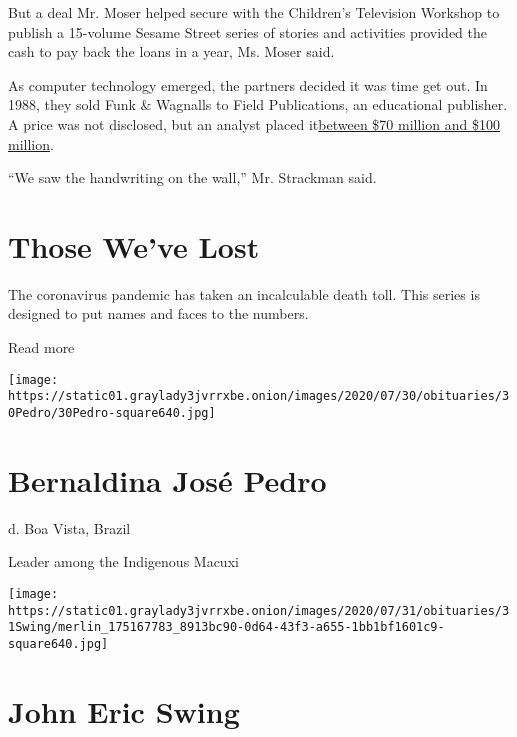But a deal Mr. Moser helped secure with the Children's Television
Workshop to publish a 15-volume Sesame Street series of stories and
activities provided the cash to pay back the loans in a year, Ms. Moser
said.

As computer technology emerged, the partners decided it was time get
out. In 1988, they sold Funk \& Wagnalls to Field Publications, an
educational publisher. A price was not disclosed, but an analyst placed
it\href{https://www.nytimes3xbfgragh.onion/1988/05/27/business/the-media-business-field-publications-agrees-to-buy-funk-wagnalls.html}{between
\$70 million and \$100 million}.

``We saw the handwriting on the wall,'' Mr. Strackman said.

\href{https://www.nytimes3xbfgragh.onion/interactive/2020/obituaries/people-died-coronavirus-obituaries.html?action=click\&pgtype=Article\&state=default\&region=BELOW_MAIN_CONTENT\&context=covid_obits_promo}{}

\hypertarget{those-weve-lost}{%
\section{Those We've Lost}\label{those-weve-lost}}

The coronavirus pandemic has taken an incalculable death toll. This
series is designed to put names and faces to the numbers.

Read more

\texttt{[image: https://static01.graylady3jvrrxbe.onion/images/2020/07/30/obituaries/30Pedro/30Pedro-square640.jpg]}

\hypertarget{bernaldina-josuxe9-pedro}{%
\section{Bernaldina José Pedro}\label{bernaldina-josuxe9-pedro}}

d. Boa Vista, Brazil

Leader among the Indigenous Macuxi

\texttt{[image: https://static01.graylady3jvrrxbe.onion/images/2020/07/31/obituaries/31Swing/merlin\_175167783\_8913bc90-0d64-43f3-a655-1bb1bf1601c9-square640.jpg]}

\hypertarget{john-eric-swing}{%
\section{John Eric Swing}\label{john-eric-swing}}

